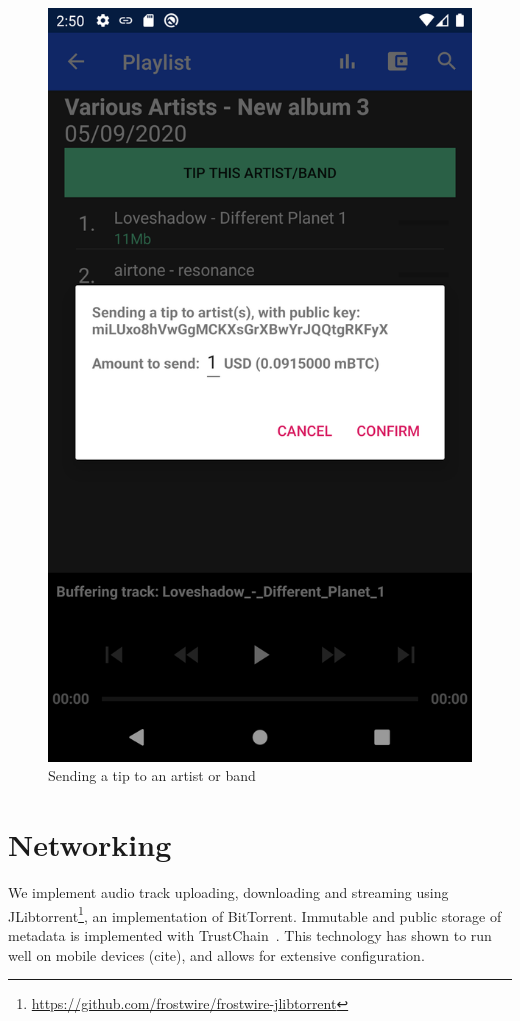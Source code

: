 \begin{figure}
        \includegraphics[width=1\linewidth]{implementation/tip-artist.png}
        \caption{Sending a tip to an artist or band}
        \label{fig:tip-artist}
    \endminipage\hfill
\end{figure}

\section{Networking}
We implement audio track uploading, downloading and streaming using JLibtorrent\footnote{\url{https://github.com/frostwire/frostwire-jlibtorrent}}, an implementation of BitTorrent. Immutable and public storage of metadata is implemented with TrustChain~\citep{otte2020trustchain}. This technology has shown to run well on mobile devices (cite), and allows for extensive configuration.
